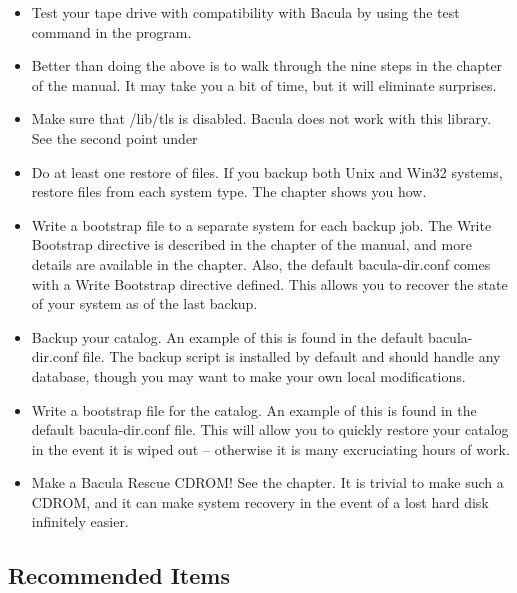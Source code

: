\begin{itemize}
\item Test your tape drive with compatibility with Bacula by using the  test
   command in the  program. 
\item Better than doing the above is to walk through the nine steps in the  
    chapter of the manual. It 
   may take you a bit of time, but it will eliminate surprises. 
\item Make sure that /lib/tls is disabled. Bacula does not work with this 
   library. See the second point under 
\item Do at least one restore of files. If you backup both Unix and Win32
   systems,  restore files from each system type. The 
    chapter shows you how. 
\item Write a bootstrap file to a separate system for each backup job.  The
   Write Bootstrap directive is described in the  
     chapter of the
   manual, and more details are available in the  
    chapter. Also, the default
   bacula-dir.conf comes with a Write Bootstrap directive defined. This  allows
   you to recover the state of your system as of the last backup.  
\item Backup your catalog. An example of this is found in the default 
   bacula-dir.conf file. The backup script is installed by default and  should
   handle any database, though you may want to make your own  local
   modifications.  
\item Write a bootstrap file for the catalog. An example of this is found in
   the default bacula-dir.conf file. This will allow you to quickly restore your
   catalog in the event it is wiped out -- otherwise it  is many excruciating
   hours of work.  
\item Make a Bacula Rescue CDROM! See the 
    chapter. It is trivial to  make such a CDROM,
   and it can make system recovery in the event of  a lost hard disk infinitely
   easier. 
\end{itemize}

\subsection*{Recommended Items}

